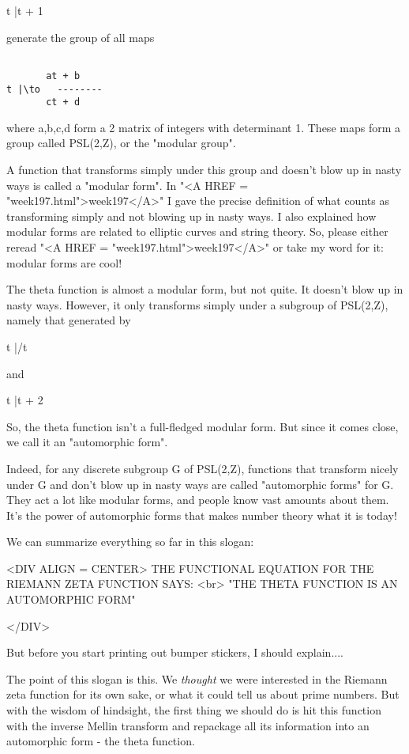 t |\to  t + 1

generate the group of all maps


\begin{verbatim}

       at + b
t |\to   --------
       ct + d
\end{verbatim}
    
where a,b,c,d form a 2 matrix of integers with determinant 1.  
These maps form a group called PSL(2,Z), or the "modular group".  

A function that transforms simply under this group and doesn't blow up 
in nasty ways is called a "modular form".  In "<A HREF = "week197.html">week197</A>" I gave the precise 
definition of what counts as transforming simply and not blowing up in 
nasty ways.  I also explained how modular forms are related to elliptic 
curves and string theory.  So, please either reread "<A HREF = "week197.html">week197</A>" or take my 
word for it: modular forms are cool!  

The theta function is almost a modular form, but not quite.  It doesn't 
blow up in nasty ways.  However, it only transforms simply under a subgroup 
of PSL(2,Z), namely that generated by 

t |/t

and

t |\to  t + 2

So, the theta function isn't a full-fledged modular form.  
But since it comes close, we call it an "automorphic form".

Indeed, for any discrete subgroup G of PSL(2,Z), functions that transform 
nicely under G and don't blow up in nasty ways are called "automorphic forms" 
for G.  They act a lot like modular forms, and people know vast amounts 
about them.  It's the power of automorphic forms that makes number theory 
what it is today!

We can summarize everything so far in this slogan:

<DIV ALIGN = CENTER>
    THE FUNCTIONAL EQUATION FOR THE RIEMANN ZETA FUNCTION SAYS: <br> 
           "THE THETA FUNCTION IS AN AUTOMORPHIC FORM"

</DIV>

But before you start printing out bumper stickers, I should explain....


The point of this slogan is this.  We \emph{thought} we were interested in 
the Riemann zeta function for its own sake, or what it could tell us 
about prime numbers.  But with the wisdom of hindsight, the first thing we 
should do is hit this function with the inverse 
Mellin transform and repackage all 
its information into an automorphic form - the theta function.  


